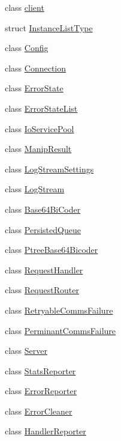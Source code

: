\begin{DoxyCompactItemize}
\item 
class \hyperlink{classkisscpp_1_1client}{client}
\item 
struct \hyperlink{structkisscpp_1_1_instance_list_type}{Instance\-List\-Type}
\item 
class \hyperlink{classkisscpp_1_1_config}{Config}
\item 
class \hyperlink{classkisscpp_1_1_connection}{Connection}
\item 
class \hyperlink{classkisscpp_1_1_error_state}{Error\-State}
\item 
class \hyperlink{classkisscpp_1_1_error_state_list}{Error\-State\-List}
\item 
class \hyperlink{classkisscpp_1_1_io_service_pool}{Io\-Service\-Pool}
\item 
class \hyperlink{classkisscpp_1_1_manip_result}{Manip\-Result}
\item 
class \hyperlink{classkisscpp_1_1_log_stream_settings}{Log\-Stream\-Settings}
\item 
class \hyperlink{classkisscpp_1_1_log_stream}{Log\-Stream}
\item 
class \hyperlink{classkisscpp_1_1_base64_bi_coder}{Base64\-Bi\-Coder}
\item 
class \hyperlink{classkisscpp_1_1_persisted_queue}{Persisted\-Queue}
\item 
class \hyperlink{classkisscpp_1_1_ptree_base64_bicoder}{Ptree\-Base64\-Bicoder}
\item 
class \hyperlink{classkisscpp_1_1_request_handler}{Request\-Handler}
\item 
class \hyperlink{classkisscpp_1_1_request_router}{Request\-Router}
\item 
class \hyperlink{classkisscpp_1_1_retryable_comms_failure}{Retryable\-Comms\-Failure}
\item 
class \hyperlink{classkisscpp_1_1_perminant_comms_failure}{Perminant\-Comms\-Failure}
\item 
class \hyperlink{classkisscpp_1_1_server}{Server}
\item 
class \hyperlink{classkisscpp_1_1_stats_reporter}{Stats\-Reporter}
\item 
class \hyperlink{classkisscpp_1_1_error_reporter}{Error\-Reporter}
\item 
class \hyperlink{classkisscpp_1_1_error_cleaner}{Error\-Cleaner}
\item 
class \hyperlink{classkisscpp_1_1_handler_reporter}{Handler\-Reporter}
\item 

\end{DoxyCompactItemize}
